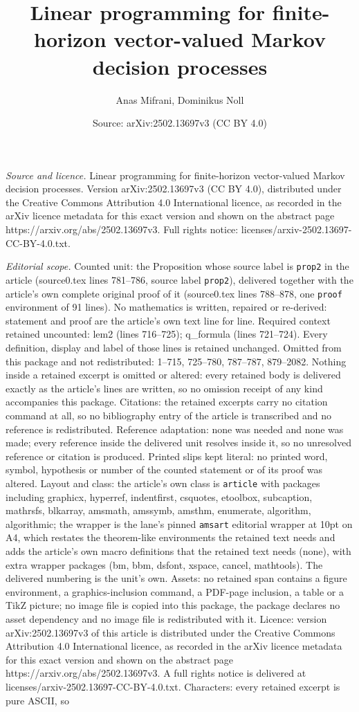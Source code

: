\documentclass[10pt,a4paper]{amsart}
\title[Linear programming for finite-horizon vector-valued Markov d]{Linear programming for finite-horizon vector-valued Markov decision processes}
\author{Anas Mifrani, Dominikus Noll}
\date{Source: arXiv:2502.13697v3 (CC BY 4.0)}
\begin{document}
\maketitle

\noindent\emph{Source and licence.} Linear programming for finite-horizon vector-valued Markov decision processes. Version arXiv:2502.13697v3 (CC BY 4.0), distributed under the Creative Commons Attribution 4.0 International licence, as recorded in the arXiv licence metadata for this exact version and shown on the abstract page https://arxiv.org/abs/2502.13697v3. Full rights notice: licenses/arxiv-2502.13697-CC-BY-4.0.txt.\par\smallskip

\noindent\textit{Editorial scope.} Counted unit: the Proposition whose source label is \texttt{prop2} in the article (source0.tex lines 781--786, source label \texttt{prop2}), delivered together with the article's own complete original proof of it (source0.tex lines 788--878, one \texttt{proof} environment of 91 lines). No mathematics is written, repaired or re-derived: statement and proof are the article's own text line for line. Required context retained uncounted: lem2 (lines 716--725); q\_formula (lines 721--724). Every definition, display and label of those lines is retained unchanged. Omitted from this package and not redistributed: 1--715, 725--780, 787--787, 879--2082. Nothing inside a retained excerpt is omitted or altered: every retained body is delivered exactly as the article's lines are written, so no omission receipt of any kind accompanies this package. Citations: the retained excerpts carry no citation command at all, so no bibliography entry of the article is transcribed and no reference is redistributed. Reference adaptation: none was needed and none was made; every reference inside the delivered unit resolves inside it, so no unresolved reference or citation is produced. Printed slips kept literal: no printed word, symbol, hypothesis or number of the counted statement or of its proof was altered. Layout and class: the article's own class is \texttt{article} with packages including graphicx, hyperref, indentfirst, csquotes, etoolbox, subcaption, mathrsfs, blkarray, amsmath, amssymb, amsthm, enumerate, algorithm, algorithmic; the wrapper is the lane's pinned \texttt{amsart} editorial wrapper at 10pt on A4, which restates the theorem-like environments the retained text needs and adds the article's own macro definitions that the retained text needs (none), with extra wrapper packages (bm, bbm, dsfont, xspace, cancel, mathtools). The delivered numbering is the unit's own. Assets: no retained span contains a figure environment, a graphics-inclusion command, a PDF-page inclusion, a table or a TikZ picture; no image file is copied into this package, the package declares no asset dependency and no image file is redistributed with it. Licence: version arXiv:2502.13697v3 of this article is distributed under the Creative Commons Attribution 4.0 International licence, as recorded in the arXiv licence metadata for this exact version and shown on the abstract page https://arxiv.org/abs/2502.13697v3. A full rights notice is delivered at licenses/arxiv-2502.13697-CC-BY-4.0.txt. Characters: every retained excerpt is pure ASCII, so 
\end{document}
